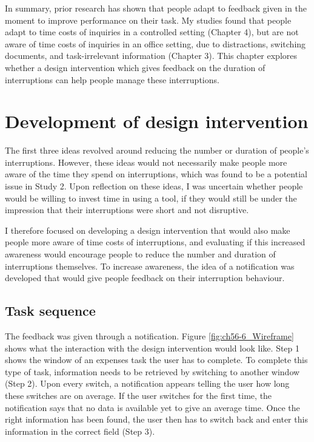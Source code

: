 In summary, prior research has shown that people adapt to feedback given in the moment to improve performance on their task. My studies found that people adapt to time costs of inquiries in a controlled setting (Chapter 4), but are not aware of time costs of inquiries in an office setting, due to distractions, switching documents, and task-irrelevant information (Chapter 3). This chapter explores whether a design intervention which gives feedback on the duration of interruptions can help people manage these interruptions.

\section{Development of design intervention}
The first three ideas revolved around reducing the number or duration of people’s interruptions. However, these ideas would not necessarily make people more aware of the time they spend on interruptions, which was found to be a potential issue in Study 2. Upon reflection on these ideas, I was uncertain whether people would be willing to invest time in using a tool, if they would still be under the impression that their interruptions were short and not disruptive. 

I therefore focused on developing a design intervention that would also make people more aware of time costs of interruptions, and evaluating if this increased awareness would encourage people to reduce the number and duration of interruptions themselves. To increase awareness, the idea of a notification was developed that would give people feedback on their interruption behaviour. 

\subsection{Task sequence}
The feedback was given through a notification. Figure \ref{fig:ch56-6_Wireframe} shows what the interaction with the design intervention would look like. Step 1 shows the window of an expenses task the user has to complete. To complete this type of task, information needs to be retrieved by switching to another window (Step 2). Upon every switch, a notification appears telling the user how long these switches are on average. If the user switches for the first time, the notification says that no data is available yet to give an average time. Once the right information has been found, the user then has to switch back and enter this information in the correct field (Step 3). 

